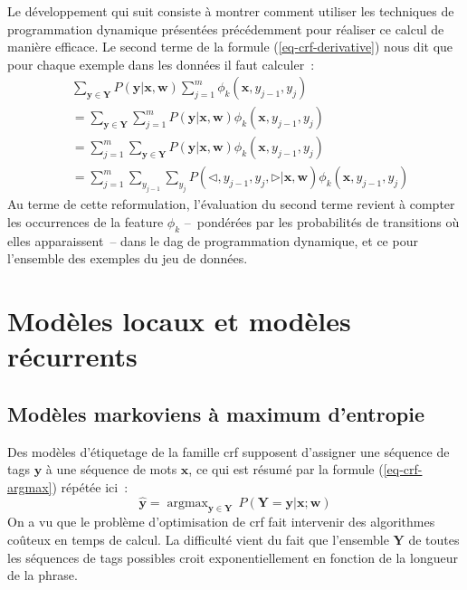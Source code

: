\documentclass[11pt,openany]{book}
\newcommand{\ac}[1]{{\sc #1}} %
\begin{document}
Le développement qui suit consiste à montrer comment utiliser les techniques de programmation dynamique présentées précédemment pour réaliser ce calcul de manière efficace.  Le second terme de la formule (\ref{eq-crf-derivative}) nous dit que pour chaque exemple dans les données il faut calculer~:
\begin{align}
&\sum_{\mathbf{y}\in \mathbf{Y}} P(\mathbf{y}|\mathbf{x},\mathbf{w}) \sum_{j=1}^m \phi_k(\mathbf{x},y_{j-1},y_j)\\
&=\sum_{\mathbf{y}\in \mathbf{Y}} \sum_{j=1}^m P(\mathbf{y}|\mathbf{x},\mathbf{w})  \phi_k(\mathbf{x},y_{j-1},y_j)\\
&= \sum_{j=1}^m \sum_{\mathbf{y}\in \mathbf{Y}} P(\mathbf{y}|\mathbf{x},\mathbf{w})  \phi_k(\mathbf{x},y_{j-1},y_j)\\
&=  \sum_{j=1}^m \sum_{y_{j-1}}\sum_{y_j} P(\lhd,y_{j-1},y_j,\rhd|\mathbf{x},\mathbf{w})  \phi_k(\mathbf{x},y_{j-1},y_j)
\end{align}
Au terme de cette reformulation, l'évaluation du second terme revient à compter les occurrences de la feature $\phi_k$ --~pondérées par les probabilités de transitions où elles apparaissent~-- dans le \ac{dag} de programmation dynamique, et ce pour l'ensemble des exemples du jeu de données.




\chapter{Modèles locaux et modèles récurrents}


\section{Modèles markoviens à maximum d'entropie}

Des modèles d'étiquetage de la famille {\sc crf} supposent d'assigner une séquence de tags
$\mathbf{y}$ à une séquence de mots $\mathbf{x}$, ce qui est résumé par la formule (\ref{eq-crf-argmax})
répétée ici~:
\begin{equation}
\hat{\mathbf{y}} =  \mathop{\text{argmax}}_{\mathbf{y}\in \mathbf{Y}}
\, P(\mathbf{Y}=\mathbf{y} | \mathbf{x} ; \mathbf{w})
\end{equation}
On a vu que le problème d'optimisation de {\sc crf} fait intervenir des algorithmes coûteux en temps de calcul. 
La difficulté vient du fait que l'ensemble $\mathbf{Y}$ de toutes les séquences de tags possibles croit exponentiellement en 
fonction de la longueur de la phrase.
\end{document}
